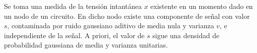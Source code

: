\ifspanish

\question[25] %

Se toma una medida de la tensión intantánea $x$ existente en un momento dado en un nodo de un circuito. En dicho nodo existe una componente de señal con valor $s$, contaminada por ruido gaussiano aditivo de media nula y varianza $v$, e independiente de la señal. A priori, el valor de $s$ sigue una densidad de probabilidad gaussiana de media y varianza unitarias.


\begin{solution}
\end{solution}

